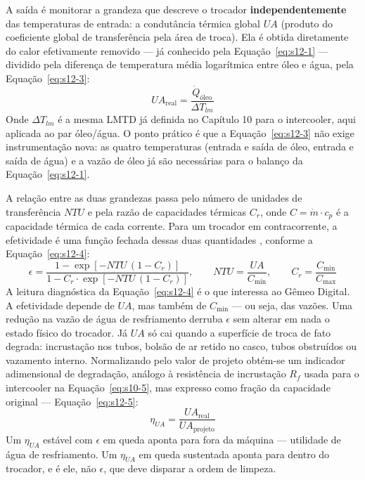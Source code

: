 \documentclass[12pt,a4paper]{article}
\numberwithin{equation}{section}
\numberwithin{table}{section}
\numberwithin{figure}{section}
\begin{document}
	A saída é monitorar a grandeza que descreve o trocador \textbf{independentemente} das temperaturas de entrada: a condutância térmica global $UA$ (produto do coeficiente global de transferência pela área de troca). Ela é obtida diretamente do calor efetivamente removido — já conhecido pela Equação~\eqref{eq:s12-1} — dividido pela diferença de temperatura média logarítmica entre óleo e água, pela Equação~\eqref{eq:s12-3}:
	\begin{equation}\label{eq:s12-3}
	UA_{\text{real}} = \frac{\dot{Q}_{\text{óleo}}}{\Delta T_{lm}}
	\end{equation}
	Onde $\Delta T_{lm}$ é a mesma LMTD já definida no Capítulo 10 para o intercooler, aqui aplicada ao par óleo/água. O ponto prático é que a Equação~\eqref{eq:s12-3} não exige instrumentação nova: as quatro temperaturas (entrada e saída de óleo, entrada e saída de água) e a vazão de óleo já são necessárias para o balanço da Equação~\eqref{eq:s12-1}.

	A relação entre as duas grandezas passa pelo número de unidades de transferência $NTU$ e pela razão de capacidades térmicas $C_r$, onde $C = \dot{m} \cdot c_p$ é a capacidade térmica de cada corrente. Para um trocador em contracorrente, a efetividade é uma função fechada dessas duas quantidades \cite{incropera}, conforme a Equação~\eqref{eq:s12-4}:
	\begin{equation}\label{eq:s12-4}
	\epsilon = \frac{1 - \exp\left[-NTU\,(1 - C_r)\right]}{1 - C_r \cdot \exp\left[-NTU\,(1 - C_r)\right]}, \qquad NTU = \frac{UA}{C_{\min}}, \qquad C_r = \frac{C_{\min}}{C_{\max}}
	\end{equation}
	A leitura diagnóstica da Equação~\eqref{eq:s12-4} é o que interessa ao Gêmeo Digital. A efetividade depende de $UA$, mas também de $C_{\min}$ — ou seja, das vazões. Uma redução na vazão de água de resfriamento derruba $\epsilon$ sem alterar em nada o estado físico do trocador. Já $UA$ só cai quando a superfície de troca de fato degrada: incrustação nos tubos, bolsão de ar retido no casco, tubos obstruídos ou vazamento interno. Normalizando pelo valor de projeto obtém-se um indicador adimensional de degradação, análogo à resistência de incrustação $R_f$ usada para o intercooler na Equação~\eqref{eq:s10-5}, mas expresso como fração da capacidade original — Equação~\eqref{eq:s12-5}:
	\begin{equation}\label{eq:s12-5}
	\eta_{UA} = \frac{UA_{\text{real}}}{UA_{\text{projeto}}}
	\end{equation}
	Um $\eta_{UA}$ estável com $\epsilon$ em queda aponta para fora da máquina — utilidade de água de resfriamento. Um $\eta_{UA}$ em queda sustentada aponta para dentro do trocador, e é ele, não $\epsilon$, que deve disparar a ordem de limpeza.
\end{document}
